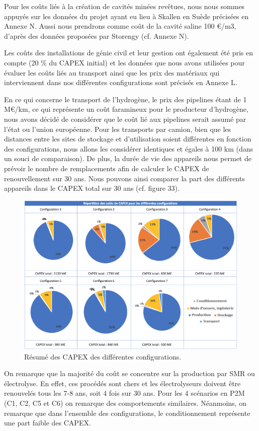 \documentclass[11pt,french,a4paper]{article}
\begin{document}
Pour les coûts liés à la création de cavités minées revêtues, nous nous sommes appuyés sur les données du projet ayant eu lieu à Skallen en Suède précisées en Annexe N. Aussi nous prendrons comme coût de la cavité saline 100 €/m3, d’après des données proposées par Storengy (cf. Annexe N). 

Les coûts des installations de génie civil et leur gestion ont également été pris en compte (20 \% du CAPEX initial) et les données que nous avons utilisées pour évaluer les coûts liés au transport ainsi que les prix des matériaux qui interviennent dans nos différentes configurations sont précisés en Annexe L. 

En ce qui concerne le transport de l’hydrogène, le prix des pipelines étant de 1 M€/km, ce qui représente un coût faramineux pour le producteur d’hydrogène, nous avons décidé de considérer que le coût lié aux pipelines serait assumé par l’état ou l’union européenne. Pour les transports par camion, bien que les distances entre les sites de stockage et d’utilisation soient différentes en fonction des configurations, nous allons les considérer identiques et égales à 100 km (dans un souci de comparaison).
De plus, la durée de vie des appareils nous permet de prévoir le nombre de remplacements afin de calculer le CAPEX de renouvellement sur 30 ans. Nous pouvons ainsi comparer la part des différents appareils dans le CAPEX total sur 30 ans (cf. figure 33).

\begin{figure}[h!]
\centering
\includegraphics[width=0.9\linewidth]{image/chap5/Tableau 2 chap 5.png}
\caption{Résumé des CAPEX des différentes configurations.}
\end{figure}

On remarque que la majorité du coût se concentre sur la production par SMR ou électrolyse. En effet, ces procédés sont chers et les électrolyseurs doivent être renouvelés tous les 7-8 ans, soit 4 fois sur 30 ans.  
Pour les 4 scénarios en P2M (C1, C2, C5 et C6) on remarque des comportements similaires.  
Néanmoins, on remarque que dans l'ensemble des configurations, le conditionnement représente une part faible des CAPEX.
\end{document}
